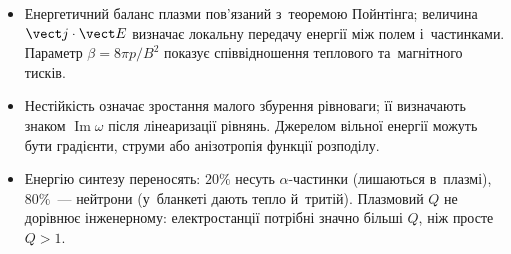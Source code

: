 \begin{itemize}
	  вмороженість є наслідком дрейфу $\vect E\times\vect B$, діамагнітний струм однаковий
	  у~частинковому, магнітному та~рідинному описах. Уздовж поля й~для тонких ефектів
	  потрібна кінетика.
	\item Енергетичний баланс плазми пов'язаний з~теоремою Пойнтінга; величина $\vect
	  j\cdot\vect E$ визначає локальну передачу енергії між полем і~частинками. Параметр
	  $\beta=8\pi p/B^2$ показує співвідношення теплового та~магнітного тисків.
\item Нестійкість означає зростання малого збурення рівноваги; її визначають знаком
  $\operatorname{Im}\omega$ після лінеаризації рівнянь. Джерелом вільної енергії можуть
  бути градієнти, струми або анізотропія функції розподілу.
\item Енергію синтезу переносять: $20\%$ несуть $\alpha$-частинки (лишаються в~плазмі),
  $80\%$~--- нейтрони (у~бланкеті дають тепло й~тритій). Плазмовий $Q$ не дорівнює
  інженерному: електростанції потрібні значно більші $Q$, ніж просте $Q>1$.
\end{itemize}







